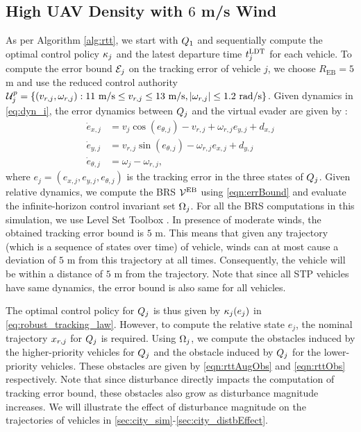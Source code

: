 \subsection{High UAV Density with $6$ m/s Wind \label{sec:city_simResults}}
As per Algorithm \ref{alg:rtt}, we start with $Q_1$ and sequentially compute the optimal control policy $\kappa_j$ and the latest departure time $t^\text{LDT}_j$ for each vehicle. To compute the error bound $\mathcal{E}_j$ on the tracking error of vehicle $j$, we choose $R_{\text{EB}} = 5$ m and use the reduced control authority $\mathcal{U}^p_j = \{(v_{r,j}, \omega_{r,j}): 11 \text{ m/s} \leq v_{r,j} \leq 13 \text{ m/s}, |\omega_{r,j}| \leq 1.2 \text{ rad/s}\}$. Given dynamics in \eqref{eq:dyn_i}, the error dynamics between $Q_j$ and the virtual evader are given by \cite{Mitchell05}:
\begin{equation}
\label{eq:reldyn}
\begin{aligned}
\dot{e}_{x,j} &= v_{j} \cos(e_{\theta,j}) - v_{r,j} + \omega_{r,j}{e}_{y,j} + d_{x,j}\\
\dot{e}_{y,j} &= v_{r,j}\sin(e_{\theta,j}) - \omega_{r,j}{e}_{x,j} + d_{y,j}\\
\dot{e}_{\theta,j} &= \omega_{j} - \omega_{r,j},
\end{aligned}
\end{equation}    
where $e_j = ({e}_{x,j}, {e}_{y,j}, {e}_{\theta,j})$ is the tracking error in the three states of $Q_j$. Given relative dynamics, we compute the BRS $\mathcal{V}^{\text{EB}}$ using \eqref{eqn:errBound} and evaluate the infinite-horizon control invariant set $\Omega_j$. For all the BRS computations in this simulation, we use Level Set Toolbox \cite{Mitchell07b}. In presence of moderate winds, the obtained tracking error bound is $5$ m. This means that given any trajectory (which is a sequence of states over time) of vehicle, winds can at most cause a deviation of $5$ m from this trajectory at all times. Consequently, the vehicle will be within a distance of $5$ m from the trajectory. Note that since all STP vehicles have same dynamics, the error bound is also same for all vehicles. 

The optimal control policy for $Q_j$ is thus given by $\kappa_j(e_j)$ in \eqref{eq:robust_tracking_law}. However, to compute the relative state $e_j$, the nominal trajectory $x_{r,j}$ for $Q_j$ is required. Using $\Omega_j$, we compute the obstacles induced by the higher-priority vehicles for $Q_j$ and the obstacle induced by $Q_j$ for the lower-priority vehicles. These obstacles are given by \eqref{eqn:rttAugObs} and \eqref{eqn:rttObs} respectively. Note that since disturbance directly impacts the computation of tracking error bound, these obstacles also grow as disturbance magnitude increases. We will illustrate the effect of disturbance magnitude on the trajectories of vehicles in \ref{sec:city_sim}-\ref{sec:city_distbEffect}.

